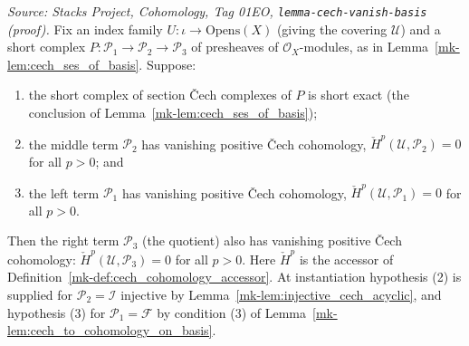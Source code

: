 \begin{lemma}\label{mk-lem:quotient_vanishing_cech}
  \leanok

  \textit{Source: Stacks Project, Cohomology, Tag 01EO,
  \texttt{lemma-cech-vanish-basis} (proof).}
  Fix an index family \(U : \iota \to \mathrm{Opens}(X)\) (giving the covering \(\mathcal{U}\)) and a
  short complex \(P : \mathcal{P}_1 \to \mathcal{P}_2 \to \mathcal{P}_3\) of presheaves of
  \(\mathcal{O}_X\)-modules, as in Lemma~\ref{mk-lem:cech_ses_of_basis}. Suppose:
  \begin{enumerate}
  \item the short complex of section {\v C}ech complexes of \(P\) is short exact (the conclusion of
    Lemma~\ref{mk-lem:cech_ses_of_basis});
  \item the middle term \(\mathcal{P}_2\) has vanishing positive {\v C}ech cohomology,
    \(\check{H}^p(\mathcal{U}, \mathcal{P}_2) = 0\) for all \(p > 0\); and
  \item the left term \(\mathcal{P}_1\) has vanishing positive {\v C}ech cohomology,
    \(\check{H}^p(\mathcal{U}, \mathcal{P}_1) = 0\) for all \(p > 0\).
  \end{enumerate}
  Then the right term \(\mathcal{P}_3\) (the quotient) also has vanishing positive {\v C}ech
  cohomology: \(\check{H}^p(\mathcal{U}, \mathcal{P}_3) = 0\) for all \(p > 0\). Here
  \(\check{H}^p\) is the accessor of Definition~\ref{mk-def:cech_cohomology_accessor}. At instantiation
  hypothesis (2) is supplied for \(\mathcal{P}_2 = \mathcal{I}\) injective by
  Lemma~\ref{mk-lem:injective_cech_acyclic}, and hypothesis (3) for \(\mathcal{P}_1 = \mathcal{F}\) by
  condition (3) of Lemma~\ref{mk-lem:cech_to_cohomology_on_basis}.
\end{lemma}

